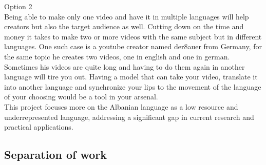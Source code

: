 \documentclass[12pt]{article}
\begin{document}
Option 2\\
Being able to make only one video and have it in multiple languages will help creators but also the target audience as well. Cutting down on the time and money it takes to make two or more videos with the same subject but in different languages. One such case is a youtube creator named der8auer from Germany, for the same topic he creates two videos, one in english and one in german. Sometimes his videos are quite long and having to do them again in another language will tire you out. Having a model that can take your video, translate it into another language and synchronize your lips to the movement of the language of your choosing would be a tool in your arsenal.\\
This project focuses more on the Albanian language as a low resource and underrepresented language, addressing a significant gap in current research and practical applications. 

\subsection{Separation of work}
\end{document}
